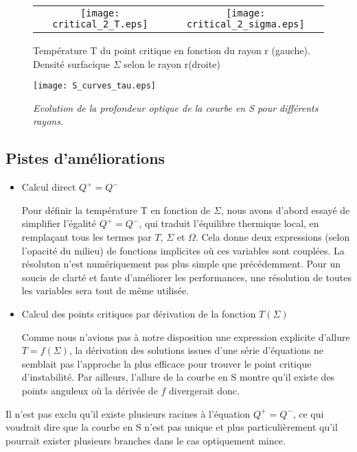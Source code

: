 \begin{figure}[htb!]
\centering
\begin{tabular}{cc} 
\texttt{[image: critical\_2\_T.eps]} &
\texttt{[image: critical\_2\_sigma.eps]} \\
\end{tabular}
  \caption{Température T du point critique en fonction du rayon r (gauche). Densité surfacique $\Sigma$ selon le rayon r(droite)}
\label{Fig::fctR}
\end{figure}
  

\begin{figure}[htb!]
	\centering
	\texttt{[image: S\_curves\_tau.eps]}
	\caption{\textit{Evolution de la profondeur optique de la courbe en S pour différents rayons.}  }
	\label{Fig::3}
\end{figure}

\subsection{Pistes d'améliorations}

\begin{itemize}

\item Calcul direct $Q^+ = Q^-$

Pour définir la température T en fonction de $\Sigma$, nous avons d'abord essayé de simplifier l'égalité $Q^+ = Q^-$, qui traduit l'équilibre thermique local, en remplaçant tous les termes par $T$, $\Sigma$ et $\Omega$. Cela donne deux expressions (selon l'opacité du milieu) de fonctions implicites où ces variables sont couplées.
La résoluton n'est numériquement pas plus simple que précédemment. Pour un soucis de clarté et faute d'améliorer les performances, une résolution de toutes les variables sera tout de même utilisée.

\item Calcul des points critiques par dérivation de la fonction $T(\Sigma)$

Comme nous n'avions pas à notre disposition une expression explicite d'allure $T = f(\Sigma)$, la dérivation des solutions issues d'une série d'équations ne semblait pas l'approche la plus efficace pour trouver le point critique d'instabilité. Par ailleurs, l'allure de la courbe en S montre qu'il existe des points anguleux où la dérivée de $f$ divergerait donc.
\end{itemize}


Il n'est pas exclu qu'il existe plusieurs racines à l'équation $Q^+ = Q^-$, ce qui voudrait dire que la courbe en S n'est pas unique et plus particulièrement qu'il pourrait exister plusieurs branches dans le cas optiquement mince. 


